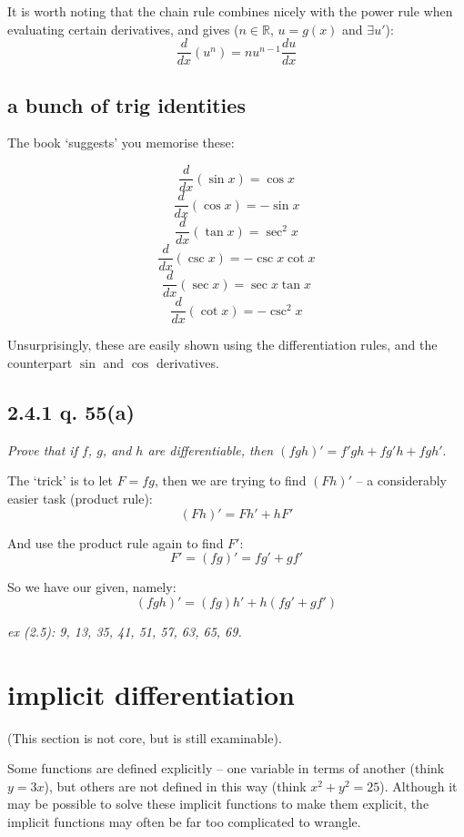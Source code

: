 \documentclass[10pt,a4paper]{report}
\begin{document}
It is worth noting that the chain rule combines nicely with the power rule when evaluating certain derivatives, and gives ($n \in \mathbb{R}$, $u = g(x)$ and $\exists u'$):
$$
	\frac{d}{dx}(u^n) = nu^{n-1} \frac{du}{dx}
$$

\subsection{a bunch of trig identities}

The book `suggests' you memorise these:

$$
	\frac{d}{dx}(\sin x) = \cos x
$$
$$
	\frac{d}{dx}(\cos x) = - \sin x
$$
$$
	\frac{d}{dx}(\tan x) = \sec^2 x
$$
$$
	\frac{d}{dx}(\csc x) = -\csc x \cot x
$$
$$
	\frac{d}{dx}(\sec x) = \sec x \tan x
$$
$$
	\frac{d}{dx}(\cot x) = - \csc^2 x
$$

Unsurprisingly, these are easily shown using the differentiation rules, and the counterpart $\sin$ and $\cos$ derivatives.


\subsection*{2.4.1 q. 55(a)}

\emph{Prove that if $f$, $g$, and $h$ are differentiable, then $(fgh)' = f'gh + fg'h + fgh'$}.

The `trick' is to let $F = fg$, then we are trying to find $(Fh)'$ -- a considerably easier task (product rule):
$$
	(Fh)' = Fh' + hF'
$$

And use the product rule again to find $F'$:
$$
	F' = (fg)' = fg' + gf'
$$

So we have our given, namely:
$$
	(fgh)' = (fg)h' + h(fg' + gf')
$$




\emph{ex (2.5): 9, 13, 35, 41, 51, 57, 63, 65, 69.}


\section{implicit differentiation}

(This section is not core, but is still examinable).

Some functions are defined explicitly -- one variable in terms of another (think $y = 3x$), but others are not defined in this way (think $x^2 + y^2 = 25$). Although it may be possible to solve these implicit functions to make them explicit, the implicit functions may often be far too complicated to wrangle.
\end{document}
